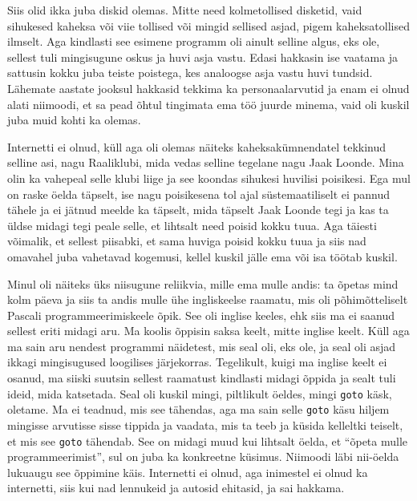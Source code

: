 
Siis olid ikka juba diskid olemas. Mitte need kolmetollised 
disketid, vaid sihukesed  kaheksa või viie tollised või mingid sellised asjad, 
pigem kaheksatollised ilmselt. Aga kindlasti see esimene programm oli ainult 
selline algus, eks ole, sellest tuli mingisugune  oskus ja huvi asja vastu. 
Edasi hakkasin ise vaatama ja  sattusin kokku juba teiste poistega, 
kes analoogse asja vastu huvi tundsid. Lähemate aastate jooksul hakkasid 
tekkima ka personaalarvutid ja enam ei olnud alati niimoodi, et sa pead õhtul 
tingimata ema töö juurde minema, vaid oli kuskil juba muid kohti ka olemas.


Internetti ei olnud, küll aga  oli olemas näiteks kaheksakümnendatel tekkinud 
selline asi, nagu Raaliklubi, mida vedas selline tegelane 
nagu Jaak Loonde. Mina olin ka vahepeal selle klubi liige ja see koondas sihukesi huvilisi poisikesi. Ega mul on raske öelda 
täpselt, ise nagu poisikesena tol ajal süstemaatiliselt ei pannud tähele ja ei 
jätnud meelde ka täpselt, mida täpselt Jaak Loonde tegi ja kas ta üldse midagi 
tegi peale selle, et lihtsalt need poisid kokku tuua. Aga täiesti võimalik, et 
sellest piisabki, et sama huviga poisid kokku tuua ja siis nad 
omavahel juba vahetavad kogemusi, kellel kuskil jälle ema või isa töötab 
kuskil. 

Minul oli näiteks üks niisugune reliikvia, mille ema mulle andis: ta õpetas 
mind kolm päeva ja siis ta andis mulle ühe ingliskeelse raamatu, mis oli 
põhimõtteliselt Pascali programmeerimiskeele õpik. See oli inglise keeles, ehk 
siis ma ei saanud sellest eriti midagi aru. Ma koolis õppisin saksa keelt, 
mitte inglise keelt. Küll aga ma sain aru 
nendest  programmi näidetest, mis seal oli, eks ole, ja seal oli asjad ikkagi 
mingisugused loogilises  järjekorras. Tegelikult, kuigi ma inglise keelt ei 
osanud, ma siiski suutsin sellest raamatust kindlasti midagi õppida ja sealt 
tuli ideid, mida katsetada. Seal oli kuskil mingi, piltlikult öeldes, mingi 
\verb|goto| käsk, oletame. Ma ei teadnud, mis see tähendas, aga ma sain 
selle \verb|goto| käsu  hiljem mingisse arvutisse sisse tippida ja 
vaadata, mis ta teeb ja küsida kelleltki teiselt, et mis see \verb|goto| tähendab. 
See on midagi muud kui lihtsalt öelda, et \enquote{õpeta mulle programmeerimist},  
sul on juba ka konkreetne küsimus. Niimoodi läbi nii-öelda lukuaugu see 
õppimine käis. Internetti ei olnud, aga  inimestel ei olnud ka internetti, siis 
kui nad  lennukeid ja autosid ehitasid, ja sai hakkama.


